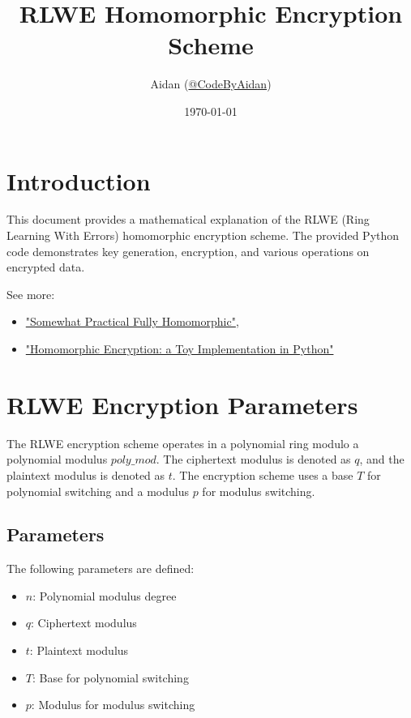 \documentclass{article}
\title{RLWE Homomorphic Encryption Scheme}
\author{
  Aidan (\href{https://github.com}{@CodeByAidan}) \\
}
\date{\today}
\begin{document}
\maketitle

\section{Introduction}

This document provides a mathematical explanation of the RLWE (Ring Learning With Errors) homomorphic encryption scheme. The provided Python code demonstrates key generation, encryption, and various operations on encrypted data.

See more: 

\begin{itemize}
    \item \href{https://eprint.iacr.org/2012/144.pdf}{"Somewhat Practical Fully Homomorphic"}, 
    \item \href{https://bit-ml.github.io/blog/post/homomorphic-encryption-toy-implementation-in-python/}{"Homomorphic Encryption: a Toy Implementation in Python"}
\end{itemize}

\section{RLWE Encryption Parameters}

The RLWE encryption scheme operates in a polynomial ring modulo a polynomial modulus $poly\_mod$. The ciphertext modulus is denoted as $q$, and the plaintext modulus is denoted as $t$. The encryption scheme uses a base $T$ for polynomial switching and a modulus $p$ for modulus switching.

\subsection{Parameters}

The following parameters are defined:

\begin{itemize}
    \item $n$: Polynomial modulus degree
    \item $q$: Ciphertext modulus
    \item $t$: Plaintext modulus
    \item $T$: Base for polynomial switching
    \item $p$: Modulus for modulus switching
\end{itemize}
\end{document}
